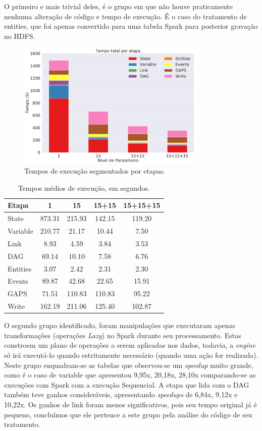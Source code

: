 O primeiro e mais trivial deles, é o grupo em que não houve praticamente 
nenhuma alteração de código e tempo de execução. É o caso do tratamento de 
entities, que foi apenas convertido para uma tabela Spark para posterior 
gravação no HDFS.

\begin{figure}[H]
\centerline{
\includegraphics[width=0.8\textwidth]{./img/total_step.pdf}}
 \caption{Tempos de execução segmentados por etapas.}
 \label{fig:total_step}
\end{figure}


\begin{table}[ht]
\centering
\small
\begin{tabular}{l c c c c} \toprule
\textbf{Etapa}  & \textbf{1} & \textbf{15} & \textbf{15+15} & 
\textbf{15+15+15}\\ 
\midrule
State		& 873.31 & 215.93 & 142.15 & 119.20\\
Variable  	& 210.77 & 21.17  & 10.44  & 7.50 \\
Link      	& 8.93   & 4.59   & 3.84   & 3.53 \\
DAG        	& 69.14  & 10.10  & 7.58   & 6.76 \\
Entities	& 3.07   & 2.42   & 2.31   & 2.30 \\
Events		& 89.87  & 42.68  & 22.65  & 15.91\\
GAPS		& 71.51  & 110.83 & 110.83 & 95.22\\
Write		& 162.19 & 211.06 & 125.40 & 102.87\\
\end{tabular}
\caption{Tempos médios de execução, em segundos.}
\label{tab:total_step}
\end{table}

O segundo grupo identificado, foram manipulações que executaram apenas 
transformações (operações \textit{Lazy}) no Spark \cite{ref:sparkbook} durante 
seu processamento. Estas constroem um plano de operações a serem aplicadas nos 
dados, todavia, a \textit{engine} só irá executá-lo quando estritamente 
necessário (quando uma ação for realizada). Neste grupo enquadram-se as tabelas 
que observou-se um \textit{speedup} muito grande, como é o caso de variable que 
apresentou 9,95x, 20,18x, 28,10x comparando-se as execuções com Spark com a 
execução Sequencial. A etapa que lida com o DAG também teve ganhos 
consideráveis, apresentando \textit{speedups} de 6,84x, 9,12x e 10,22x. Os 
ganhos de link foram menos significativos, pois seu tempo original já é 
pequeno, concluímos que ele pertence a este grupo pela análise do código de seu 
tratamento.


